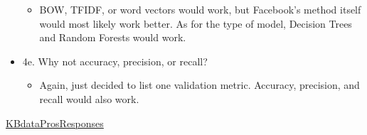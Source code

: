 \documentclass[letterpaper]{article}
\begin{document}
\begin{itemize}
\begin{itemize}
\item BOW, TFIDF, or word vectors would work, but Facebook's method itself
would most likely work better. As for the type of model, Decision
Trees and Random Forests would work.
\end{itemize}

\item 4e. Why not accuracy, precision, or recall?

\begin{itemize}
\item Again, just decided to list one validation metric. Accuracy,
precision, and recall would also work.
\end{itemize}
\end{itemize}

\href{KBdataProsResponses.org}{KBdataProsResponses}
\end{document}

